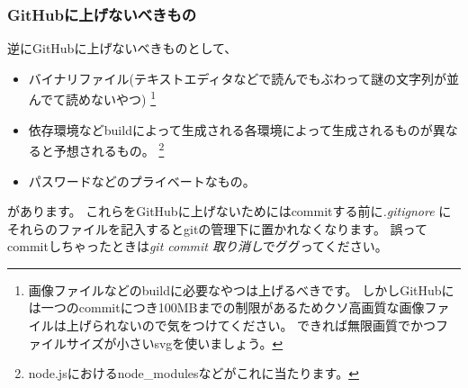 \documentclass[dvipdfmx,jb5]{jarticle}
\begin{document}
\subsubsection{GitHubに上げないべきもの}
逆にGitHubに上げないべきものとして、
\begin{itemize}
  \item バイナリファイル(テキストエディタなどで読んでもぶわって謎の文字列が並んでて読めないやつ)
  \footnote{画像ファイルなどのbuildに必要なやつは上げるべきです。
  しかしGitHubには一つのcommitにつき100MBまでの制限があるためクソ高画質な画像ファイルは上げられないので気をつけてください。
  できれば無限画質でかつファイルサイズが小さいsvgを使いましょう。
  }
  \item 依存環境などbuildによって生成される各環境によって生成されるものが異なると予想されるもの。
  \footnote{node.jsにおけるnode\_modulesなどがこれに当たります。}
  \item パスワードなどのプライベートなもの。
\end{itemize}
があります。
これらをGitHubに上げないためにはcommitする前に\emph{.gitignore}
にそれらのファイルを記入するとgitの管理下に置かれなくなります。
誤ってcommitしちゃったときは\emph{git commit 取り消し}でググってください。
\end{document}
